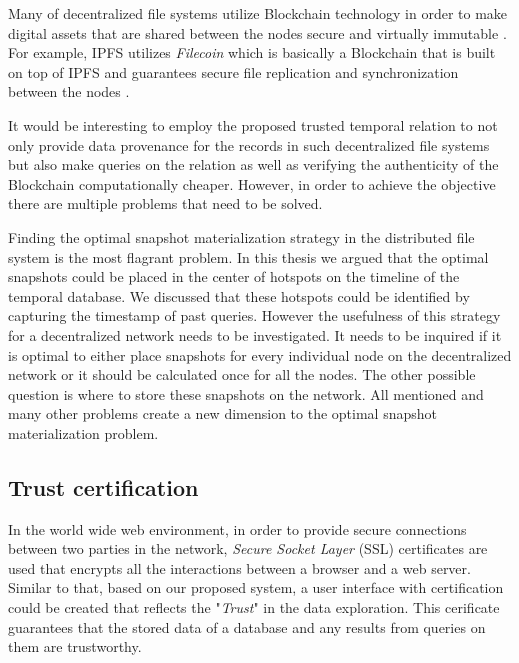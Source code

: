 			Many of decentralized file systems utilize Blockchain technology in order to make digital assets that are shared between the nodes secure and virtually immutable \cite{wang2018ablockchain}. For example, IPFS utilizes {\it Filecoin} which is basically a Blockchain that is built on top of IPFS and guarantees secure file replication and synchronization between the nodes \cite{vatsalya2018marinehull}.

			It would be interesting to employ the proposed trusted temporal relation to not only provide data provenance for the records in such decentralized file systems but also make queries on the relation as well as verifying the authenticity of the Blockchain computationally cheaper. However, in order to achieve the objective there are multiple problems that need to be solved.

			Finding the optimal snapshot materialization strategy in the distributed file system is the most flagrant problem. In this thesis we argued that the optimal snapshots could be placed in the center of hotspots on the timeline of the temporal database. We discussed that these hotspots could be identified by capturing the timestamp of past queries. However the usefulness of this strategy for a decentralized network needs to be investigated. It needs to be inquired if it is optimal to either place snapshots for every individual node on the decentralized network or it should be calculated once for all the nodes. The other possible question is where to store these snapshots on the network. All mentioned and many other problems create a new dimension to the optimal snapshot materialization problem.

		\subsection {Trust certification}
			In the world wide web environment, in order to provide secure connections between two parties in the network, {\it Secure Socket Layer} (SSL) certificates are used that encrypts all the interactions between a browser and a web server. Similar to that, based on our proposed system, a user interface with certification could be created that reflects the "{\it Trust}" in the data exploration. This cerificate guarantees that the stored data of a database and any results from queries on them are trustworthy. 
